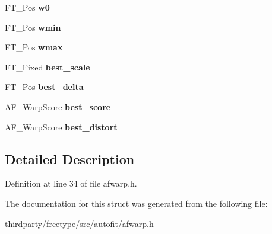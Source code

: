 \begin{DoxyCompactItemize}
F\+T\+\_\+\+Pos {\bfseries w0}
\item 
\mbox{\label{struct_a_f___warper_rec___a1a15dc2afdcfa705501098c171b25866}} 
F\+T\+\_\+\+Pos {\bfseries wmin}
\item 
\mbox{\label{struct_a_f___warper_rec___a1c9cf18c0275832edc88c0e4ede6bfe3}} 
F\+T\+\_\+\+Pos {\bfseries wmax}
\item 
\mbox{\label{struct_a_f___warper_rec___ae0a0caa7063809f2fea6fa3b8a59e183}} 
F\+T\+\_\+\+Fixed {\bfseries best\+\_\+scale}
\item 
\mbox{\label{struct_a_f___warper_rec___a6a76ab4d788fb42e02df6e1fb140aa03}} 
F\+T\+\_\+\+Pos {\bfseries best\+\_\+delta}
\item 
\mbox{\label{struct_a_f___warper_rec___a41352949e7c0eae7cb2fbbde4bfecad3}} 
A\+F\+\_\+\+Warp\+Score {\bfseries best\+\_\+score}
\item 
\mbox{\label{struct_a_f___warper_rec___ae072c9a54aa08d707a1dbd60b0e5eff8}} 
A\+F\+\_\+\+Warp\+Score {\bfseries best\+\_\+distort}
\end{DoxyCompactItemize}


\subsection{Detailed Description}


Definition at line 34 of file afwarp.\+h.



The documentation for this struct was generated from the following file\+:\begin{DoxyCompactItemize}
\item 
thirdparty/freetype/src/autofit/afwarp.\+h\end{DoxyCompactItemize}
